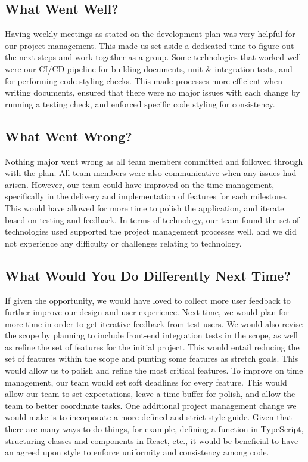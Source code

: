 \documentclass{article}
\begin{document}
\subsection{What Went Well?}
Having weekly meetings as stated on the development plan was very helpful for our project
management. This made us set aside a dedicated time to figure out the next steps and work together
as a group. Some technologies that worked well were our CI/CD pipeline for building documents, unit
\& integration tests, and for performing code styling checks. This made processes more efficient
when writing documents, ensured that there were no major issues with each change by running a
testing check, and enforced specific code styling for consistency.

\subsection{What Went Wrong?}
Nothing major went wrong as all team members committed and followed through with the plan. All team
members were also communicative when any issues had arisen. However, our team could have improved
on the time management, specifically in the delivery and implementation of features for each
milestone. This would have allowed for more time to polish the application, and iterate based on
testing and feedback. In terms of technology, our team found the set of technologies used supported
the project management processes well, and we did not experience any difficulty or challenges
relating to technology.

\subsection{What Would You Do Differently Next Time?}
If given the opportunity, we would have loved to collect more user feedback to further improve our
design and user experience. Next time, we would plan for more time in order to get iterative
feedback from test users. We would also revise the scope by planning to include front-end
integration tests in the scope, as well as refine the set of features for the initial project. This
would entail reducing the set of features within the scope and punting some features as stretch
goals. This would allow us to polish and refine the most critical features. To improve on time
management, our team would set soft deadlines for every feature. This would allow our team to set
expectations, leave a time buffer for polish, and allow the team to better coordinate tasks. One
additional project management change we would make is to incorporate a more defined and strict
style guide. Given that there are many ways to do things, for example, defining a function in
TypeScript, structuring classes and components in React, etc., it would be beneficial to have an
agreed upon style to enforce uniformity and consistency among code.
\end{document}
